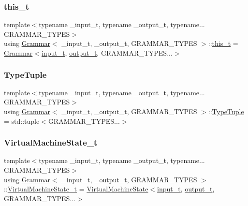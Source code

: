 \mbox{\label{class_grammar_a3193857749e93b641ca05524f94c388e}} 
\subsubsection{\texorpdfstring{this\+\_\+t}{this\_t}}
{\footnotesize\ttfamily template$<$typename \+\_\+input\+\_\+t, typename \+\_\+output\+\_\+t, typename... G\+R\+A\+M\+M\+A\+R\+\_\+\+T\+Y\+P\+ES$>$ \\
using \hyperlink{class_grammar}{Grammar}$<$ \+\_\+input\+\_\+t, \+\_\+output\+\_\+t, G\+R\+A\+M\+M\+A\+R\+\_\+\+T\+Y\+P\+ES $>$\+::\hyperlink{class_grammar_a3193857749e93b641ca05524f94c388e}{this\+\_\+t} =  \hyperlink{class_grammar}{Grammar}$<$\hyperlink{class_grammar_a11116f6d2f48f79def498a97549c67d4}{input\+\_\+t}, \hyperlink{class_grammar_aee7630d758322022048d06605b07e697}{output\+\_\+t}, G\+R\+A\+M\+M\+A\+R\+\_\+\+T\+Y\+P\+E\+S...$>$}

\mbox{\label{class_grammar_abfb390f3654ce837c97c8b3d0d3b5f0f}} 
\subsubsection{\texorpdfstring{Type\+Tuple}{TypeTuple}}
{\footnotesize\ttfamily template$<$typename \+\_\+input\+\_\+t, typename \+\_\+output\+\_\+t, typename... G\+R\+A\+M\+M\+A\+R\+\_\+\+T\+Y\+P\+ES$>$ \\
using \hyperlink{class_grammar}{Grammar}$<$ \+\_\+input\+\_\+t, \+\_\+output\+\_\+t, G\+R\+A\+M\+M\+A\+R\+\_\+\+T\+Y\+P\+ES $>$\+::\hyperlink{class_grammar_abfb390f3654ce837c97c8b3d0d3b5f0f}{Type\+Tuple} =  std\+::tuple$<$G\+R\+A\+M\+M\+A\+R\+\_\+\+T\+Y\+P\+E\+S...$>$}

\mbox{\label{class_grammar_a62e87cde3f753a426cc6688c4dde40b8}} 
\subsubsection{\texorpdfstring{Virtual\+Machine\+State\+\_\+t}{VirtualMachineState\_t}}
{\footnotesize\ttfamily template$<$typename \+\_\+input\+\_\+t, typename \+\_\+output\+\_\+t, typename... G\+R\+A\+M\+M\+A\+R\+\_\+\+T\+Y\+P\+ES$>$ \\
using \hyperlink{class_grammar}{Grammar}$<$ \+\_\+input\+\_\+t, \+\_\+output\+\_\+t, G\+R\+A\+M\+M\+A\+R\+\_\+\+T\+Y\+P\+ES $>$\+::\hyperlink{class_grammar_a62e87cde3f753a426cc6688c4dde40b8}{Virtual\+Machine\+State\+\_\+t} =  \hyperlink{class_virtual_machine_state}{Virtual\+Machine\+State}$<$\hyperlink{class_grammar_a11116f6d2f48f79def498a97549c67d4}{input\+\_\+t}, \hyperlink{class_grammar_aee7630d758322022048d06605b07e697}{output\+\_\+t}, G\+R\+A\+M\+M\+A\+R\+\_\+\+T\+Y\+P\+E\+S...$>$}



